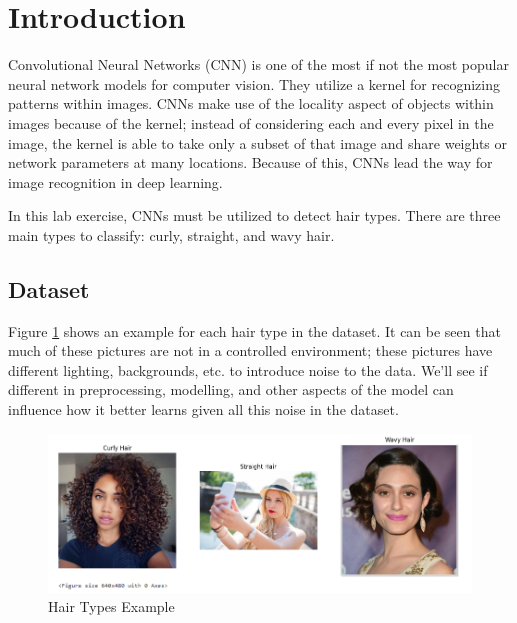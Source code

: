 \section{Introduction}

Convolutional Neural Networks (CNN) is one of the most if not the most popular neural network models for computer vision. They utilize a kernel for recognizing patterns within images. CNNs make use of the locality aspect of objects within images because of the kernel; instead of considering each and every pixel in the image, the kernel is able to take only a subset of that image and share weights or network parameters at many locations. Because of this, CNNs lead the way for image recognition in deep learning. 

In this lab exercise, CNNs must be utilized to detect hair types. There are three main types to classify: curly, straight, and wavy hair. 

\subsection{Dataset}

Figure \ref{fig:hairtypes} shows an example for each hair type in the dataset. It can be seen that much of these pictures are not in a controlled environment; these pictures have different lighting, backgrounds, etc. to introduce noise to the data. We'll see if different in preprocessing, modelling, and other aspects of the model can influence how it better learns given all this noise in the dataset.

\begin{figure}[H]
  \includegraphics[width=\linewidth]{figures/hairtypes.png}
  \caption{Hair Types Example}
  \label{fig:hairtypes}
\end{figure}
